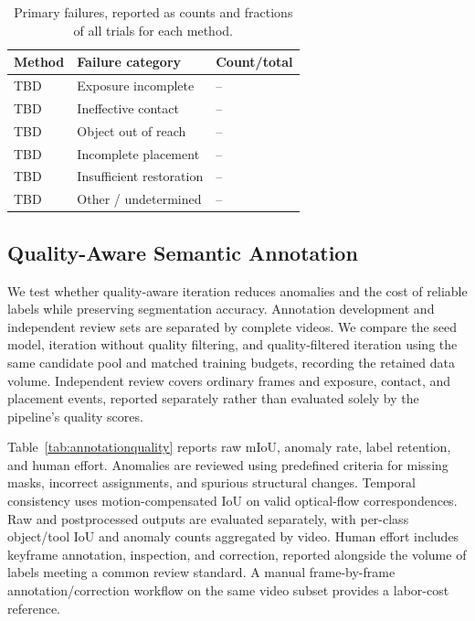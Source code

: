 \begin{table}[!tb]
\caption{Primary failures, reported as counts and fractions of all trials for each method.}
\label{tab:failurecounts}
\centering\small
\setlength{\tabcolsep}{3pt}
\begin{tabular}{lp{}l}
\toprule
Method & Failure category & Count/total\\
\midrule
TBD & Exposure incomplete & --\\
TBD & Ineffective contact & --\\
TBD & Object out of reach & --\\
TBD & Incomplete placement & --\\
TBD & Insufficient restoration & --\\
TBD & Other / undetermined & --\\
\bottomrule
\end{tabular}
\end{table}

\subsection{Quality-Aware Semantic Annotation}
\label{sec:annotationexperiments}
We test whether quality-aware iteration reduces anomalies and the cost of reliable labels while preserving segmentation accuracy.
Annotation development and independent review sets are separated by complete videos.
We compare the seed model, iteration without quality filtering, and quality-filtered iteration using the same candidate pool and matched training budgets, recording the retained data volume.
Independent review covers ordinary frames and exposure, contact, and placement events, reported separately rather than evaluated solely by the pipeline's quality scores.

Table~\ref{tab:annotationquality} reports raw mIoU, anomaly rate, label retention, and human effort.
Anomalies are reviewed using predefined criteria for missing masks, incorrect assignments, and spurious structural changes.
Temporal consistency uses motion-compensated IoU on valid optical-flow correspondences.
Raw and postprocessed outputs are evaluated separately, with per-class object/tool IoU and anomaly counts aggregated by video.
Human effort includes keyframe annotation, inspection, and correction, reported alongside the volume of labels meeting a common review standard.
A manual frame-by-frame annotation/correction workflow on the same video subset provides a labor-cost reference.


